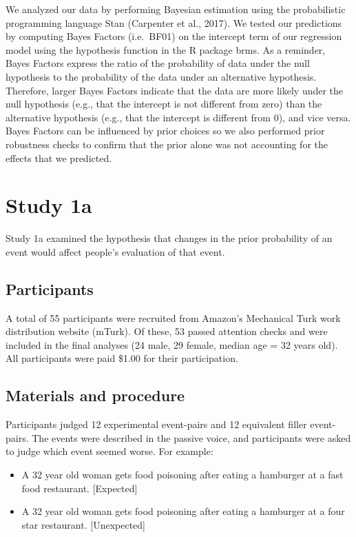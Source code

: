 \documentclass[10pt, letterpaper]{article}
\begin{document}
We analyzed our data by performing Bayesian estimation using the
probabilistic programming language Stan (Carpenter et al., 2017). We
tested our predictions by computing Bayes Factors (i.e.~BF01) on the
intercept term of our regression model using the hypothesis function in
the R package brms. As a reminder, Bayes Factors express the ratio of
the probability of data under the null hypothesis to the probability of
the data under an alternative hypothesis. Therefore, larger Bayes
Factors indicate that the data are more likely under the null hypothesis
(e.g., that the intercept is not different from zero) than the
alternative hypothesis (e.g., that the intercept is different from 0),
and vice versa. Bayes Factors can be influenced by prior choices so we
also performed prior robustness checks to confirm that the prior alone
was not accounting for the effects that we predicted.

\section{Study 1a}\label{study-1a}

Study 1a examined the hypothesis that changes in the prior probability
of an event would affect people's evaluation of that event.

\subsection{Participants}\label{participants}

A total of 55 participants were recruited from Amazon's Mechanical Turk
work distribution website (mTurk). Of these, 53 passed attention checks
and were included in the final analyses (24 male, 29 female, median age
= 32 years old). All participants were paid \$1.00 for their
participation.

\subsection{Materials and procedure}\label{materials-and-procedure}

Participants judged 12 experimental event-pairs and 12 equivalent filler
event-pairs. The events were described in the passive voice, and
participants were asked to judge which event seemed worse. For example:

\begin{itemize}
\item
  A 32 year old woman gets food poisoning after eating a hamburger at a
  fast food restaurant. {[}Expected{]}
\item
  A 32 year old woman gets food poisoning after eating a hamburger at a
  four star restaurant. {[}Unexpected{]}
\end{itemize}
\end{document}
